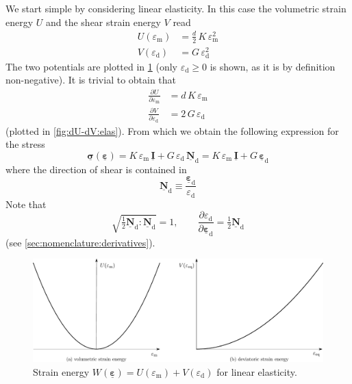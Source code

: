 \documentclass[fleqn]{goose-article}
\newcommand\T[1]{\underline{\bm{{#1}}}}
\begin{document}
We start simple by considering linear elasticity.
In this case the volumetric strain energy $U$ and the shear strain energy $V$ read
\begin{align}
    \label{eq:W:elas}
    U (\varepsilon_\mathrm{m})
    &= \frac{d}{2} \, K \, \varepsilon_\mathrm{m}^2
    \\
    \label{eq:V:elas}
    V (\varepsilon_\mathrm{d})
    &= G \, \varepsilon_\mathrm{d}^2
\end{align}
The two potentials are plotted in \cref{fig:U-V:elas}
(only $\varepsilon_\mathrm{d} \geq 0$ is shown, as it is by definition non-negative).
It is trivial to obtain that
\begin{align}
    \frac{\partial U}{\partial \varepsilon_\mathrm{m}}
    &= d \, K \, \varepsilon_\mathrm{m}
    \\
    \frac{\partial V}{\partial \varepsilon_\mathrm{d}}
    &= 2 \, G \, \varepsilon_\mathrm{d}
\end{align}
(plotted in \cref{fig:dU-dV:elas}).
From which we obtain the following expression for the stress
\begin{equation}
    \label{eq:sig-elas}
    \T{\sigma} ( \T{\varepsilon} )
    =
    K \, \varepsilon_\mathrm{m} \, \T{I}
    +
    G \, \varepsilon_\mathrm{d} \, \T{N}_\mathrm{d}
    =
    K \, \varepsilon_\mathrm{m} \, \T{I}
    +
    G \, \T{\varepsilon}_\mathrm{d}
\end{equation}
where the direction of shear is contained in
\begin{equation}
    \T{N}_\mathrm{d} \equiv \frac{\T{\varepsilon}_\mathrm{d}}{\varepsilon_\mathrm{d}}
\end{equation}
Note that
\begin{equation}
    \sqrt{\tfrac{1}{2} \T{N}_\mathrm{d} : \T{N}_\mathrm{d}} = 1,
    \qquad
    \frac{
        \partial \varepsilon_\mathrm{d}
    }{
        \partial \T{\varepsilon}_\mathrm{d}
    }
    = \tfrac{1}{2} \T{N}_\mathrm{d}
\end{equation}
(see \cref{sec:nomenclature:derivatives}).

\begin{figure}[htp]
    \centering
    \includegraphics[width=1.\textwidth]{figures/potential_U-V_elas}
    \caption{
        Strain energy
        $W(\T{\varepsilon}) = U(\varepsilon_\mathrm{m}) + V(\varepsilon_\mathrm{d})$
        for linear elasticity.}
    \label{fig:U-V:elas}
\end{figure}
\end{document}
